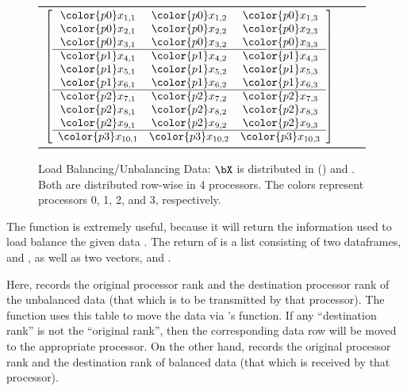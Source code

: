 \begin{figure}[h]
\begin{center}
\begin{tabular}{ccc}
$
\left[
\begin{array}{ccc}
\color{p0}x_{1,1} & \color{p0}x_{1,2} & \color{p0}x_{1,3} \\
\color{p0}x_{2,1} & \color{p0}x_{2,2} & \color{p0}x_{2,3} \\
\color{p0}x_{3,1} & \color{p0}x_{3,2} & \color{p0}x_{3,3} \\ \hline
\color{p1}x_{4,1} & \color{p1}x_{4,2} & \color{p1}x_{4,3} \\
\color{p1}x_{5,1} & \color{p1}x_{5,2} & \color{p1}x_{5,3} \\
\color{p1}x_{6,1} & \color{p1}x_{6,2} & \color{p1}x_{6,3} \\ \hline
\color{p2}x_{7,1} & \color{p2}x_{7,2} & \color{p2}x_{7,3} \\
\color{p2}x_{8,1} & \color{p2}x_{8,2} & \color{p2}x_{8,3} \\
\color{p2}x_{9,1} & \color{p2}x_{9,2} & \color{p2}x_{9,3} \\ \hline
\color{p3}x_{10,1} & \color{p3}x_{10,2} & \color{p3}x_{10,3} \\
\end{array}
\right]
$
\end{tabular}
\end{center}
\caption[Load Balancing/Unbalancing Data]{
Load Balancing/Unbalancing Data:  $\bX$ is distributed in
() and .
Both are distributed row-wise in 4 processors.  The colors represent processors {\color{p0}0},
{\color{p1}1}, {\color{p2}2}, and {\color{p3}3}, respectively.
}
\label{fig:load_balance}
\end{figure}
 

The function  is extremely useful, because it will return the information used to load balance the given data .  The return of  is a list consisting of two dataframes,  and , as well as two vectors,  and .  

Here,  records the original processor rank and the destination processor rank of the unbalanced data (that which is to be transmitted by that processor).
The  function uses this table to move the data via 's  function.
If any ``destination rank'' is not the ``original rank'', then the corresponding data row will be moved to the appropriate processor.  On the other hand,  records the original processor rank and the destination rank of balanced data (that which is received by that processor).

